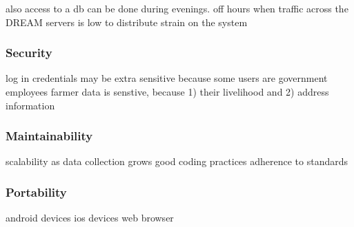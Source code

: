 also access to a db can be done during evenings. off hours when traffic across the DREAM servers is low to distribute strain on the system
\subsubsection{Security}

log in credentials may be extra sensitive because some users are government employees
farmer data is senstive, because 1) their livelihood and 2) address information
\subsubsection{Maintainability}
scalability as data collection grows
good coding practices
adherence to standards

\subsubsection{Portability}
android devices
ios devices
web browser

